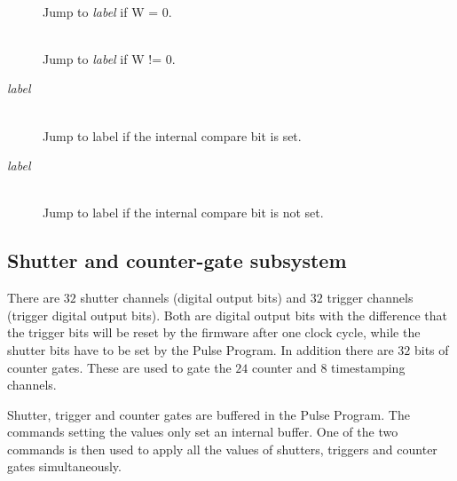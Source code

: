 \documentclass[11pt]{scrartcl}
\begin{document}
\begin{addmargin}{1cm}
\begin{description}
\item[ ]  \hfill\\  
Jump to {\it label} if W = 0.

\item[ ] \hfill\\   
Jump to {\it label} if W != 0.

\item[ {\it label}] \hfill\\   
Jump to label if the internal compare bit is set.

\item[ {\it label}] \hfill\\   
Jump to label if the internal compare bit is not set.
\end{description}
\end{addmargin}

\subsection{Shutter and counter-gate subsystem}
There are $32$ shutter channels (digital output bits) and $32$ trigger channels (trigger digital output bits). Both are digital output bits with the difference that the trigger bits will be reset by the firmware after one clock cycle, while the shutter bits have to be set by the Pulse Program. In addition there are $32$ bits of counter gates. These are used to gate the $24$ counter and $8$ timestamping channels.

Shutter, trigger and counter gates are buffered in the Pulse Program. The commands setting the values only set an internal buffer. One of the two  commands is then used to apply all the values of shutters, triggers and counter gates simultaneously.
\end{document}
